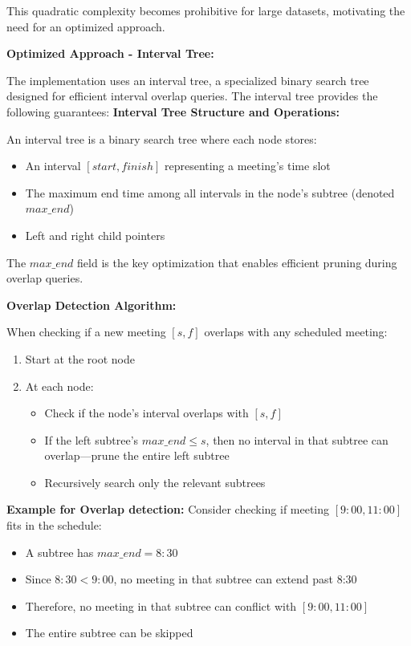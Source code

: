 \documentclass[conference]{IEEEtran}
\begin{document}
This quadratic complexity becomes prohibitive for large datasets, motivating the need for an optimized approach.

\textbf{Optimized Approach - Interval Tree:}

The implementation uses an interval tree, a specialized binary search tree designed for efficient interval overlap queries. The interval tree provides the following guarantees:
\textbf{Interval Tree Structure and Operations:}

An interval tree is a binary search tree where each node stores:
\begin{itemize}
    \item An interval $[start, finish]$ representing a meeting's time slot
    \item The maximum end time among all intervals in the node's subtree (denoted $max\_end$)
    \item Left and right child pointers
\end{itemize}

The $max\_end$ field is the key optimization that enables efficient pruning during overlap queries.

\textbf{Overlap Detection Algorithm:}

When checking if a new meeting $[s, f]$ overlaps with any scheduled meeting:

\begin{enumerate}
    \item Start at the root node
    \item At each node:
    \begin{itemize}
        \item Check if the node's interval overlaps with $[s, f]$
        \item If the left subtree's $max\_end \leq s$, then no interval in that subtree can overlap—prune the entire left subtree
        \item Recursively search only the relevant subtrees
    \end{itemize}
\end{enumerate}

\textbf{Example for Overlap detection:} Consider checking if meeting $[9:00, 11:00]$ fits in the schedule:
\begin{itemize}
    \item A subtree has $max\_end = 8:30$
    \item Since $8:30 < 9:00$, no meeting in that subtree can extend past 8:30
    \item Therefore, no meeting in that subtree can conflict with $[9:00, 11:00]$
    \item The entire subtree can be skipped
\end{itemize}
\end{document}
